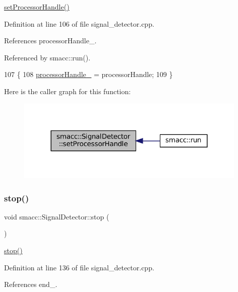\hyperlink{classsmacc_1_1SignalDetector_ac1197a77c32a3b817005391e550ce646}{set\+Processor\+Handle()} 

Definition at line 106 of file signal\+\_\+detector.\+cpp.



References processor\+Handle\+\_\+.



Referenced by smacc\+::run().


\begin{DoxyCode}
107 \{
108     \hyperlink{classsmacc_1_1SignalDetector_a9a77dc9f0e9f8f56dff5e76077abcb78}{processorHandle\_} = processorHandle;
109 \}
\end{DoxyCode}
Here is the caller graph for this function\+:
\nopagebreak
\begin{figure}[H]
\begin{center}
\leavevmode
\includegraphics[width=312pt]{classsmacc_1_1SignalDetector_ac1197a77c32a3b817005391e550ce646_icgraph}
\end{center}
\end{figure}
\mbox{\label{classsmacc_1_1SignalDetector_a536ea005ea4ef4632c0c9c1c62c557a3}} 
\subsubsection{\texorpdfstring{stop()}{stop()}}
{\footnotesize\ttfamily void smacc\+::\+Signal\+Detector\+::stop (\begin{DoxyParamCaption}{ }\end{DoxyParamCaption})}

\hyperlink{classsmacc_1_1SignalDetector_a536ea005ea4ef4632c0c9c1c62c557a3}{stop()} 

Definition at line 136 of file signal\+\_\+detector.\+cpp.



References end\+\_\+.


